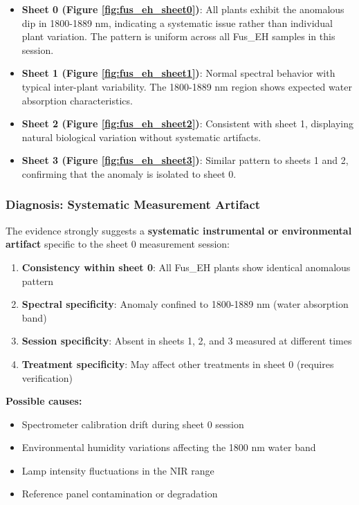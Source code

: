 \documentclass[12pt,a4paper]{article}
\begin{document}
\begin{itemize}
    \item \textbf{Sheet 0 (Figure \ref{fig:fus_eh_sheet0})}: All plants exhibit the anomalous dip in 1800-1889 nm, indicating a systematic issue rather than individual plant variation. The pattern is uniform across all Fus\_EH samples in this session.
    
    \item \textbf{Sheet 1 (Figure \ref{fig:fus_eh_sheet1})}: Normal spectral behavior with typical inter-plant variability. The 1800-1889 nm region shows expected water absorption characteristics.
    
    \item \textbf{Sheet 2 (Figure \ref{fig:fus_eh_sheet2})}: Consistent with sheet 1, displaying natural biological variation without systematic artifacts.
    
    \item \textbf{Sheet 3 (Figure \ref{fig:fus_eh_sheet3})}: Similar pattern to sheets 1 and 2, confirming that the anomaly is isolated to sheet 0.
\end{itemize}

\subsubsection{Diagnosis: Systematic Measurement Artifact}

The evidence strongly suggests a \textbf{systematic instrumental or environmental artifact} specific to the sheet 0 measurement session:

\begin{enumerate}
    \item \textbf{Consistency within sheet 0}: All Fus\_EH plants show identical anomalous pattern
    \item \textbf{Spectral specificity}: Anomaly confined to 1800-1889 nm (water absorption band)
    \item \textbf{Session specificity}: Absent in sheets 1, 2, and 3 measured at different times
    \item \textbf{Treatment specificity}: May affect other treatments in sheet 0 (requires verification)
\end{enumerate}

\textbf{Possible causes:}
\begin{itemize}
    \item Spectrometer calibration drift during sheet 0 session
    \item Environmental humidity variations affecting the 1800 nm water band
    \item Lamp intensity fluctuations in the NIR range
    \item Reference panel contamination or degradation
\end{itemize}
\end{document}
